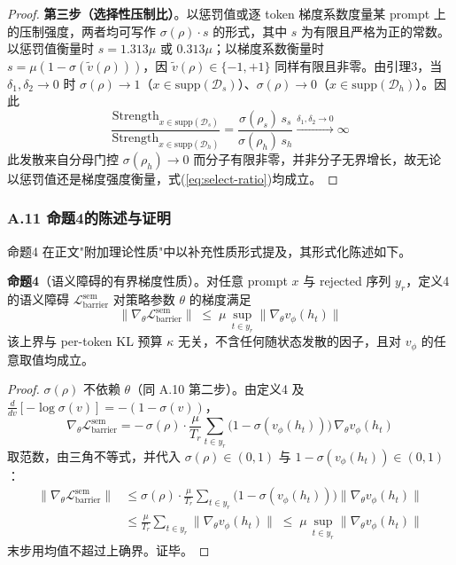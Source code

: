 \documentclass[lettersize,journal]{IEEEtran}
\begin{document}
\begin{proof}
\textbf{第三步（选择性压制比）}。以惩罚值或逐 token 梯度系数度量某 prompt 上的压制强度，两者均可写作 $\sigma(\rho)\cdot s$ 的形式，其中 $s$ 为有限且严格为正的常数。以惩罚值衡量时 $s = 1.313\mu$ 或 $0.313\mu$；以梯度系数衡量时 $s = \mu(1-\sigma(\tilde{v}(\rho)))$，因 $\tilde{v}(\rho) \in \{-1, +1\}$ 同样有限且非零。由引理3，当 $\delta_1, \delta_2 \to 0$ 时 $\sigma(\rho) \to 1$（$x \in \mathrm{supp}(\mathcal{D}_s)$）、$\sigma(\rho) \to 0$（$x \in \mathrm{supp}(\mathcal{D}_h)$）。因此
\begin{equation}
\frac{\text{Strength}_{x \in \mathrm{supp}(\mathcal{D}_s)}}
{\text{Strength}_{x \in \mathrm{supp}(\mathcal{D}_h)}}
= \frac{\sigma(\rho_s)\,s_s}{\sigma(\rho_h)\,s_h}
\xrightarrow[]{\delta_1, \delta_2 \to 0} \infty
\end{equation}
此发散来自分母门控 $\sigma(\rho_h) \to 0$ 而分子有限非零，并非分子无界增长，故无论以惩罚值还是梯度强度衡量，式(\ref{eq:select-ratio})均成立。
\end{proof}

\subsubsection{A.11 命题4的陈述与证明}\label{app:bdgrad}

命题4 在正文"附加理论性质"中以补充性质形式提及，其形式化陈述如下。

\textbf{命题4}（语义障碍的有界梯度性质）。对任意 prompt $x$ 与 rejected 序列 $y_r$，定义4的语义障碍 $\mathcal{L}^{\text{sem}}_{\text{barrier}}$ 对策略参数 $\theta$ 的梯度满足
\begin{equation}\label{eq:bdgrad}
\bigl\|\nabla_\theta\mathcal{L}^{\text{sem}}_{\text{barrier}}\bigr\|
\;\leq\; \mu\,\sup_{t \in y_r}\bigl\|\nabla_\theta v_\phi(h_t)\bigr\|
\end{equation}
该上界与 per-token KL 预算 $\kappa$ 无关，不含任何随状态发散的因子，且对 $v_\phi$ 的任意取值均成立。

\begin{proof}
$\sigma(\rho)$ 不依赖 $\theta$（同 A.10 第二步）。由定义4 及 $\frac{d}{dv}[-\log\sigma(v)] = -(1-\sigma(v))$，
\begin{equation}
\nabla_\theta\mathcal{L}^{\text{sem}}_{\text{barrier}}
= -\,\sigma(\rho)\cdot\frac{\mu}{T_r}\sum_{t \in y_r}
\bigl(1-\sigma(v_\phi(h_t))\bigr)\,\nabla_\theta v_\phi(h_t)
\end{equation}
取范数，由三角不等式，并代入 $\sigma(\rho) \in (0, 1)$ 与 $1-\sigma(v_\phi(h_t)) \in (0, 1)$：
\begin{equation}
\begin{aligned}
\bigl\|\nabla_\theta\mathcal{L}^{\text{sem}}_{\text{barrier}}\bigr\|
&\leq \sigma(\rho)\cdot\frac{\mu}{T_r}\sum_{t \in y_r}
\bigl(1-\sigma(v_\phi(h_t))\bigr)\bigl\|\nabla_\theta v_\phi(h_t)\bigr\| \\
&\leq \frac{\mu}{T_r}\sum_{t \in y_r}\bigl\|\nabla_\theta v_\phi(h_t)\bigr\|
\;\leq\; \mu\,\sup_{t \in y_r}\bigl\|\nabla_\theta v_\phi(h_t)\bigr\|
\end{aligned}
\end{equation}
末步用均值不超过上确界。证毕。
\end{proof}
\end{document}
